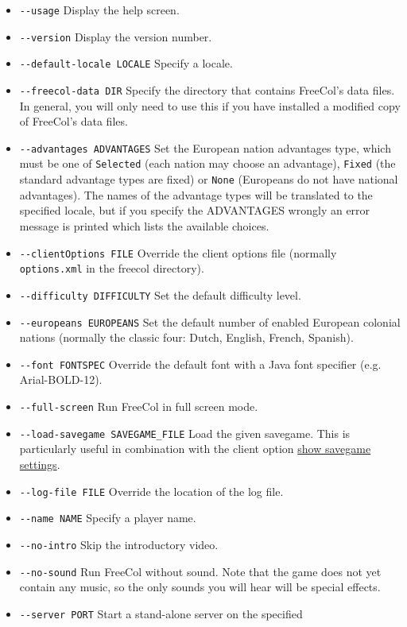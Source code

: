 \documentclass[12pt]{book}
\begin{document}
\begin{itemize}
\item\verb$--usage$ Display the help screen.
\item\verb$--version$ Display the version number.
\item\verb$--default-locale LOCALE$ Specify a locale.
\item\verb$--freecol-data DIR$ Specify the directory that contains
FreeCol's data files. In general, you will only need to use this if
you have installed a modified copy of FreeCol's data files.
\item\verb$--advantages ADVANTAGES$ Set the European nation advantages
  type, which must be one of \texttt{Selected} (each nation may choose
  an advantage), \texttt{Fixed} (the standard advantage types are
  fixed) or \texttt{None} (Europeans do not have national advantages).
  The names of the advantage types will be translated to the specified
  locale, but if you specify the ADVANTAGES wrongly an error message is
  printed which lists the available choices.
\item\verb$--clientOptions FILE$ Override the client options file
  (normally \texttt{options.xml} in the freecol directory).
\item\verb$--difficulty DIFFICULTY$ Set the default difficulty level.
\item\verb$--europeans EUROPEANS$ Set the default number of enabled
  European colonial nations (normally the classic four: Dutch,
  English, French, Spanish).
\item\verb$--font FONTSPEC$ Override the default font with a Java
font specifier (e.g. Arial-BOLD-12).
\item\verb$--full-screen$ Run FreeCol in full screen mode.
\item\verb$--load-savegame SAVEGAME_FILE$ Load the given
  savegame. This is particularly useful in combination with the client
  option \hyperlink{show savegame settings}{show savegame settings}.
\item\verb$--log-file FILE$ Override the location of the log file.
\item\verb$--name NAME$ Specify a player name.
\item\verb$--no-intro$ Skip the introductory video.
\item\verb$--no-sound$ Run FreeCol without sound. Note that the game
does not yet contain any music, so the only sounds you will hear will
be special effects.
\item\verb$--server PORT$ Start a stand-alone server on the specified

\end{itemize}
\end{document}
